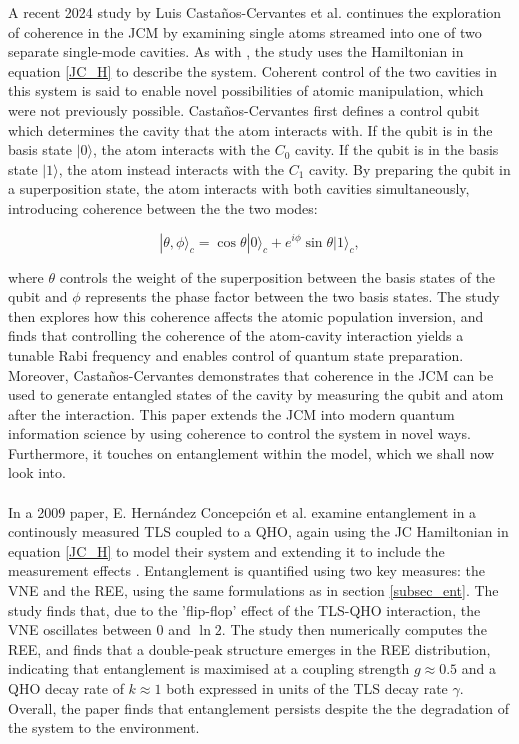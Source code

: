 \documentclass[12pt,a4paper]{article}
\begin{document}

A recent 2024 study by Luis Castaños-Cervantes et al. continues the exploration of coherence in the JCM by examining single atoms streamed into one of two separate single-mode cavities. As with \cite{CohEnt2020-Cavity_controlled_coherence}, the study uses the Hamiltonian in equation \eqref{JC_H} to describe the system. Coherent control of the two cavities in this system is said to enable novel possibilities of atomic manipulation, which were not previously possible. Castaños-Cervantes first defines a control qubit which determines the cavity that the atom interacts with. If the qubit is in the basis state $|0\rangle$, the atom interacts with the $C_0$ cavity. If the qubit is in the basis state $|1\rangle$, the atom instead interacts with the $C_1$ cavity. By preparing the qubit in a superposition state, the atom interacts with both cavities simultaneously, introducing coherence between the the two modes:

\begin{equation}
    |\theta,\phi\rangle_c = \cos{\theta}|0\rangle_c + e^{i\phi}\sin{\theta}|1\rangle_c,
\end{equation}

where $\theta$ controls the weight of the superposition between the basis states of the qubit and $\phi$ represents the phase factor between the two basis states. The study then explores how this coherence affects the atomic population inversion, and finds that controlling the coherence of the atom-cavity interaction yields a tunable Rabi frequency and enables control of quantum state preparation. Moreover, Castaños-Cervantes demonstrates that coherence in the JCM can be used to generate entangled states of the cavity by measuring the qubit and atom after the interaction. This paper extends the JCM into modern quantum information science by using coherence to control the system in novel ways. Furthermore, it touches on entanglement within the model, which we shall now look into.\\
\\
In a 2009 paper, E. Hern\'andez Concepci\'on et al. examine entanglement in a continously measured TLS coupled to a QHO, again using the JC Hamiltonian in equation \eqref{JC_H} to model their system and extending it to include the measurement effects \cite{Entanglement2009-REE_VNapplied}. Entanglement is quantified using two key measures: the VNE and the REE, using the same formulations as in section \ref{subsec_ent}. The study finds that, due to the 'flip-flop' effect of the TLS-QHO interaction, the VNE oscillates between 0 and $\ln{2}$. The study then numerically computes the REE, and finds that a double-peak structure emerges in the REE distribution, indicating that entanglement is maximised at a coupling strength $g\approx0.5$ and a QHO decay rate of $k\approx1$ both expressed in units of the TLS decay rate $\gamma$. Overall, the paper finds that entanglement persists despite the the degradation of the system to the environment. 
\end{document}
